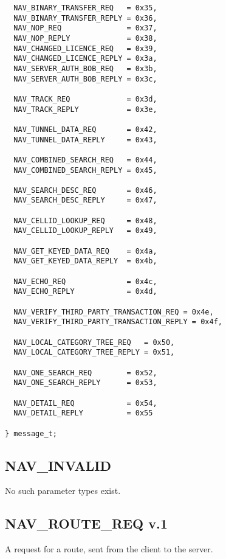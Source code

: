 \documentclass[a4paper]{article}
\begin{document}
\begin{verbatim}
  NAV_BINARY_TRANSFER_REQ   = 0x35,
  NAV_BINARY_TRANSFER_REPLY = 0x36,
  NAV_NOP_REQ               = 0x37,
  NAV_NOP_REPLY             = 0x38,
  NAV_CHANGED_LICENCE_REQ   = 0x39,
  NAV_CHANGED_LICENCE_REPLY = 0x3a,
  NAV_SERVER_AUTH_BOB_REQ   = 0x3b,
  NAV_SERVER_AUTH_BOB_REPLY = 0x3c,

  NAV_TRACK_REQ             = 0x3d,
  NAV_TRACK_REPLY           = 0x3e,

  NAV_TUNNEL_DATA_REQ       = 0x42,
  NAV_TUNNEL_DATA_REPLY     = 0x43,

  NAV_COMBINED_SEARCH_REQ   = 0x44,
  NAV_COMBINED_SEARCH_REPLY = 0x45,

  NAV_SEARCH_DESC_REQ       = 0x46,
  NAV_SEARCH_DESC_REPLY     = 0x47,

  NAV_CELLID_LOOKUP_REQ     = 0x48,
  NAV_CELLID_LOOKUP_REPLY   = 0x49,

  NAV_GET_KEYED_DATA_REQ    = 0x4a,
  NAV_GET_KEYED_DATA_REPLY  = 0x4b,

  NAV_ECHO_REQ              = 0x4c,
  NAV_ECHO_REPLY            = 0x4d,

  NAV_VERIFY_THIRD_PARTY_TRANSACTION_REQ = 0x4e,
  NAV_VERIFY_THIRD_PARTY_TRANSACTION_REPLY = 0x4f,

  NAV_LOCAL_CATEGORY_TREE_REQ   = 0x50,
  NAV_LOCAL_CATEGORY_TREE_REPLY = 0x51,

  NAV_ONE_SEARCH_REQ        = 0x52,
  NAV_ONE_SEARCH_REPLY      = 0x53,

  NAV_DETAIL_REQ            = 0x54,
  NAV_DETAIL_REPLY          = 0x55

} message_t;
\end{verbatim}



\subsection{NAV\_INVALID}
No such parameter types exist.



\subsection{NAV\_ROUTE\_REQ v.1}

A request for a route, sent from the client to the
server.
\end{document}
